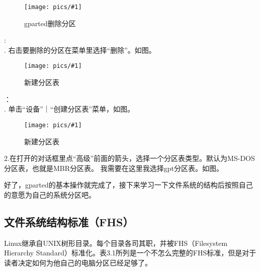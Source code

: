 \documentclass[amstex]{ctexbook}
\newcommand{\chatu}[2]{%
\begin{figure}[h]%
\centering%
\texttt{[image: pics/\#1]}%
\caption{#2}%
\end{figure}%
}
\begin{document}
\chatu{gparted-delpart}{gparted删除分区}
:\\. 右击要删除的分区在菜单里选择“删除”。如图。 %

\chatu{gparted-newpt1.png}{新建分区表}

：\\. 单击“设备”｜“创建分区表”菜单，如图。

\chatu{gparted-newpt2.png}{新建分区表}

\indent2.在打开的对话框里点“高级”前面的箭头，选择一个分区表类型。默认为MS-DOS分区表，也就是MBR分区表。
我需要在这里我选择gpt分区表。如图。

\FloatBarrier

好了，gparted的基本操作就完成了，接下来学习一下文件系统的结构后按照自己的意愿为自己的系统分区吧。

\subsection{文件系统结构标准（FHS）}

Linux继承自UNIX树形目录。每个目录各司其职，并被FHS（Filesystem Hierarchy Standard）标准化。表3.1所列是一个不怎么完整的FHS标准，但是对于读者决定如何为他自己的电脑分区已经足够了。
\end{document}
